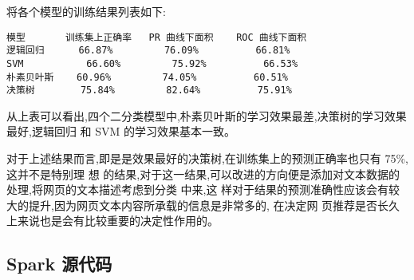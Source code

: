 将各个模型的训练结果列表如下:

\begin{lstlisting}
模型       训练集上正确率   PR 曲线下面积    ROC 曲线下面积
逻辑回归      66.87%         76.09%          66.81%
SVM           66.60%         75.92%          66.53%
朴素贝叶斯    60.96%         74.05%          60.51%
决策树        75.84%         82.64%          75.91%
\end{lstlisting}

从上表可以看出,四个二分类模型中,朴素贝叶斯的学习效果最差,决策树的学习效果最好,逻辑回归
和 SVM 的学习效果基本一致。

对于上述结果而言,即是是效果最好的决策树,在训练集上的预测正确率也只有
75\%,这并不是特别理 想
的结果,对于这一结果,可以改进的方向便是添加对文本数据的处理,将网页的文本描述考虑到分类
中来,这
样对于结果的预测准确性应该会有较大的提升,因为网页文本内容所承载的信息是非常多的,
在决定网 页推荐是否长久上来说也是会有比较重要的决定性作用的。

\subsection{Spark 源代码}\label{spark-ux6e90ux4ee3ux7801}

